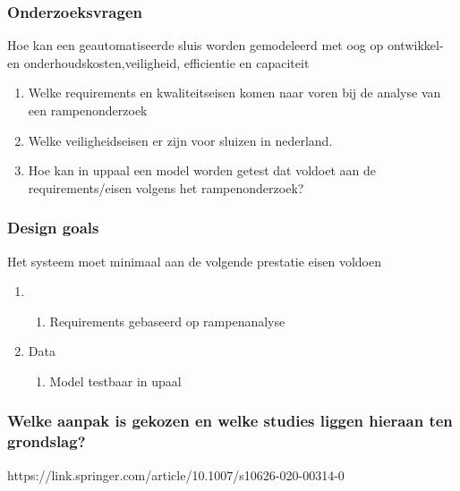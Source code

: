 \subsubsection{Onderzoeksvragen }

Hoe kan een geautomatiseerde sluis worden gemodeleerd met oog op ontwikkel- en onderhoudskosten,veiligheid, efficientie en capaciteit





\begin{enumerate}
	
	\item Welke requirements en kwaliteitseisen komen naar voren bij de analyse van een rampenonderzoek
	\item Welke veiligheidseisen er zijn voor sluizen in nederland. 
	\item Hoe kan in uppaal  een model worden getest dat voldoet aan de requirements/eisen volgens het rampenonderzoek?
\end{enumerate}



\subsubsection{Design goals}
Het systeem moet minimaal aan de volgende prestatie eisen voldoen 

\begin{enumerate}
	\item  
	\begin{enumerate}
		\item Requirements gebaseerd op rampenanalyse
	\end{enumerate}
	\item Data
	\begin{enumerate}
		\item Model testbaar in upaal
	\end{enumerate}
	
\end{enumerate}

\subsubsection{Welke aanpak is gekozen en welke studies liggen hieraan ten grondslag?}
https://link.springer.com/article/10.1007/s10626-020-00314-0


